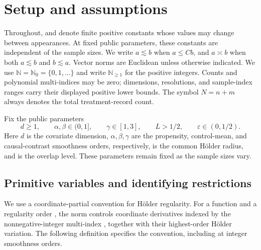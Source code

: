 \section{Setup and assumptions}\label{sec:setup}

Throughout,  and  denote finite positive constants whose values may change between appearances. At fixed public parameters, these constants are independent of the sample sizes. We write \(a\lesssim b\) when \(a\le Cb\), and \(a\asymp b\) when both \(a\lesssim b\) and \(b\lesssim a\). Vector norms are Euclidean unless otherwise indicated. We use \(\mathbb N=\mathbb N_0=\{0,1,\ldots\}\) and write \(\mathbb N_{\ge1}\) for the positive integers. Counts and polynomial multi-indices may be zero; dimensions, resolutions, and sample-index ranges carry their displayed positive lower bounds. The symbol \(N=n+m\) always denotes the total treatment-record count.

Fix the public parameters
\[
d\ge1,\qquad
\alpha,\beta\in(0,1],\qquad
\gamma\in[1,3],\qquad
L>1/2,\qquad
\varepsilon\in(0,1/2).
\]
Here \(d\) is the covariate dimension, \(\alpha,\beta,\gamma\) are the propensity, control-mean, and causal-contrast smoothness orders, respectively,  is the common Hölder radius, and  is the overlap level. These parameters remain fixed as the sample sizes vary.

\subsection{Primitive variables and identifying restrictions}

We use a coordinate-partial convention for Hölder regularity. For a function  and a regularity order , the norm  controls coordinate derivatives indexed by the nonnegative-integer multi-index , together with their highest-order Hölder variation. The following definition specifies the convention, including at integer smoothness orders.

